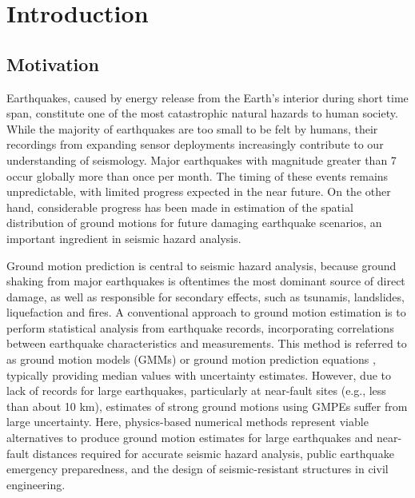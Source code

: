 
\linespread{1.7}
\chapter{Introduction}
\linespread{2.0}
\label{chap:intro}

\section{Motivation}
Earthquakes, caused by energy release from the Earth's interior during short time span, constitute one of the most catastrophic natural hazards to human society. While the majority of earthquakes are too small to be felt by humans, their recordings from expanding sensor deployments increasingly contribute to our understanding of seismology. Major earthquakes with magnitude greater than 7 occur globally more than once per month. The timing of these events remains unpredictable, with limited progress expected in the near future. On the other hand, considerable progress has been made in estimation of the spatial distribution of ground motions for future damaging earthquake scenarios, an important ingredient in seismic hazard analysis.

Ground motion prediction is central to seismic hazard analysis, because ground shaking from major earthquakes is oftentimes the most dominant source of direct damage, as well as responsible for secondary effects, such as tsunamis, landslides, liquefaction and fires. A conventional approach to ground motion estimation is to perform statistical analysis from earthquake records, incorporating correlations between earthquake characteristics and measurements. This method is referred to as ground motion models (GMMs) or ground motion prediction equations \citep[GMPEs; e.g., ][]{abrahamsonSummaryASK14Ground2014,booreNGAWest2EquationsPredicting2014,campbellNGAWest2GroundMotion2014,chiouUpdateChiouYoungs2014, idrissNGAWest2EmpiricalModel2014}, typically providing median values with uncertainty estimates. However, due to lack of records for large earthquakes, particularly at near-fault sites (e.g., less than about 10 km), estimates of strong ground motions using GMPEs suffer from large uncertainty. Here, physics-based numerical methods represent viable alternatives to produce ground motion estimates for large earthquakes and near-fault distances required for accurate seismic hazard analysis, public earthquake emergency preparedness, and the design of seismic-resistant structures in civil engineering.

